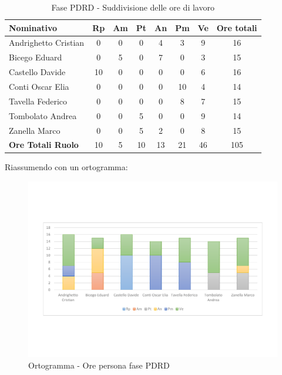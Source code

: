\documentclass[../PianoProgetto.tex]{subfiles}
\begin{document}
	\begin{table}[h]
	
		\begin{tabularx}{\textwidth}{l  * {6}{C}  c}
			\toprule
			\textbf{Nominativo} & \textbf{Rp} & \textbf{Am} & \textbf{Pt} 
						& \textbf{An} & \textbf{Pm} & \textbf{Ve} & \textbf{Ore totali} \\
			\midrule
			Andrighetto Cristian & 0 & 0 & 0 & 4 & 3 & 9 & 16 \\
			Bicego Eduard & 0 & 5 &	0 &	7 &	0 &	3 &	15 \\
			Castello Davide & 10 & 0 & 0 & 0 & 0 & 6 & 16 \\
			Conti Oscar Elia & 0 & 0 & 0 & 0 & 10 &	4 &	14 \\
			Tavella Federico &	0 & 0 &	0 &	0 &	8 &	7 &	15 \\
			Tombolato Andrea & 0 & 0 & 5 & 0 & 0 & 9 & 14 \\
			Zanella Marco & 0 & 0 & 5 &	2 &	0 &	8 &	15 \\
			\midrule			
			\textbf{Ore Totali Ruolo} & 10 & 5 & 10 & 13 &	21 & 46 & 105 \\
			\bottomrule
		\end{tabularx}
		\caption{Fase PDRD - Suddivisione delle ore di lavoro}
		\label{tab:fasePDRD_ore}
	\end{table}
\vfill	
	Riassumendo con un ortogramma:
	
	\begin{figure}[!h]
		\centering
		\includegraphics[width=\textwidth , trim=2cm 5cm 2cm 5cm]{grafici/PDRD/PDRD-ore-persona}
			\caption{Ortogramma - Ore persona fase PDRD}
		\label{fig:BarChart-fasePDRD_ore}
	\end{figure}
\vfill	
\newpage	
	
\end{document}

